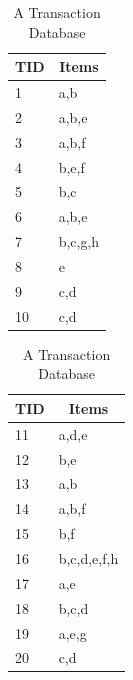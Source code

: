 \documentclass[conference]{IEEEtran}
\begin{document}
\begin{table}[!tb]
    \caption{A Transaction Database}\label{db}
    \centering
    \begin{tabular}{|l|l|}
    \hline
    TID & \multicolumn{1}{c|}{Items} \\ \hline
    1   & a,b   \\ \hline
    2   & a,b,e \\ \hline
    3   & a,b,f \\ \hline
    4   & b,e,f \\ \hline
    5   & b,c   \\ \hline
    6   & a,b,e \\ \hline
    7   & b,c,g,h \\ \hline
    8   & e     \\ \hline
    9   & c,d   \\ \hline
    10  & c,d   \\ \hline
    \end{tabular}
    \begin{tabular}{|l|l|}
    \hline
    TID & \multicolumn{1}{c|}{Items} \\ \hline
    11  & a,d,e          \\ \hline
    12  & b,e        \\ \hline
    13  & a,b         \\ \hline
    14  & a,b,f        \\ \hline
    15  & b,f      \\ \hline
    16  & b,c,d,e,f,h  \\ \hline
    17  & a,e        \\ \hline
    18  & b,c,d          \\ \hline
    19  & a,e,g         \\ \hline
    20  & c,d        \\ \hline
    \end{tabular}
\end{table}
\end{document}
